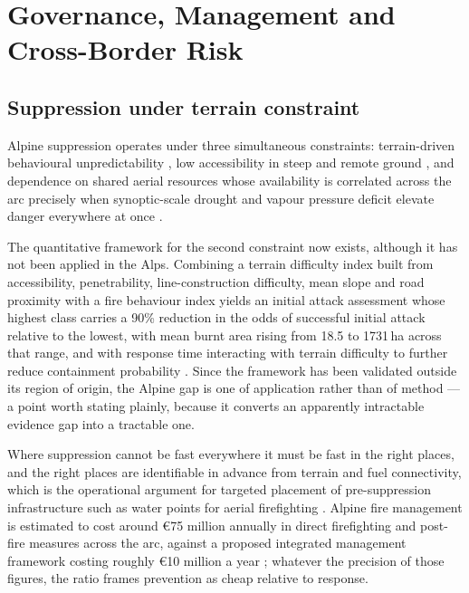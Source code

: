 \documentclass[11pt,a4paper]{article}
\begin{document}
\section{Governance, Management and Cross-Border Risk}
\label{sec:governance}

\subsection{Suppression under terrain constraint}

Alpine suppression operates under three simultaneous constraints: terrain-driven behavioural unpredictability \citep{sharples_overview_2009, melzner_brief_2019}, low accessibility in steep and remote ground \citep{muller_forest_2020}, and dependence on shared aerial resources whose availability is correlated across the arc precisely when synoptic-scale drought and vapour pressure deficit elevate danger everywhere at once \citep{miller_compounding_2025}.

The quantitative framework for the second constraint now exists, although it has not been applied in the Alps. Combining a terrain difficulty index built from accessibility, penetrability, line-construction difficulty, mean slope and road proximity with a fire behaviour index yields an initial attack assessment whose highest class carries a 90\% reduction in the odds of successful initial attack relative to the lowest, with mean burnt area rising from 18.5 to 1731\,ha across that range, and with response time interacting with terrain difficulty to further reduce containment probability \citep{cardil_assessing_2025}. Since the framework has been validated outside its region of origin, the Alpine gap is one of application rather than of method --- a point worth stating plainly, because it converts an apparently intractable evidence gap into a tractable one.

Where suppression cannot be fast everywhere it must be fast in the right places, and the right places are identifiable in advance from terrain and fuel connectivity, which is the operational argument for targeted placement of pre-suppression infrastructure such as water points for aerial firefighting \citep{conedera_linking_2024}. Alpine fire management is estimated to cost around €75 million annually in direct firefighting and post-fire measures across the arc, against a proposed integrated management framework costing roughly €10 million a year \citep{muller_forest_2020}; whatever the precision of those figures, the ratio frames prevention as cheap relative to response.
\end{document}
